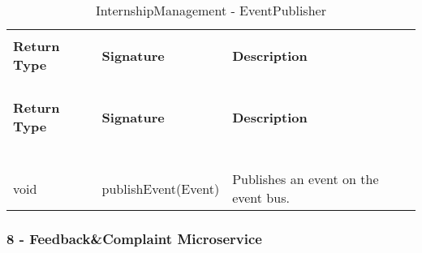 \begin{longtable}{p{}p{}p{}}
    \caption{InternshipManagement - EventPublisher}
    \vspace{0.5em}\\
    \hline
    \vspace{0.5em}\\
    \textbf{Return Type} & \textbf{Signature} & \textbf{Description} \\
    \vspace{0.5em}\\
    \hline
    \vspace{0.5em}\\
    \endfirsthead
    \vspace{0.5em}\\
    \hline
    \vspace{0.5em}\\
    \textbf{Return Type} & \textbf{Signature} & \textbf{Description} \\
    \vspace{0.5em}\\
    \hline
    \vspace{0.5em}\\
    \endhead
    
    \vspace{0.5em}\\
    \hline
    \vspace{0.5em}\\
    \endfoot
    
    \vspace{0.5em}\\
    \hline
    \vspace{0.5em}\\
    \endlastfoot
    
    void &
    publishEvent(Event) &
    Publishes an event on the event bus. \\

\end{longtable}

\subsubsection{8 - Feedback\&Complaint Microservice}


